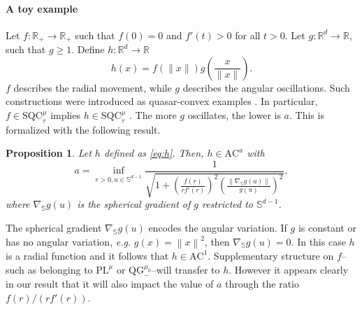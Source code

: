\documentclass{article}
\def\R{{\mathbb{R}}}
\def\sphere{\mathbb{S}}
\def\pl{{\text{PL}^\mu}}
\newcommand{\bpar}[1]{\left(#1\right)}
\newcommand{\norm}[1]{\left\lVert#1\right\rVert}
\newcommand{\sqc}{\text{SQC}_{\tau}^{\mu}}
\newcommand{\ac}{\text{AC}^{a}}
\newcommand{\acf}[1]{\text{AC}^{#1}}
\newcommand{\qginf}{\text{QG}_{-}^{\mu_0}}
\theoremstyle{plain}
\newtheorem{proposition}[theorem]{Proposition}
\theoremstyle{definition}
\theoremstyle{remark}
\begin{document}

\paragraph{A toy example}
 Let $f:\R_+ \to \R_+$ such that $f(0) = 0$ and $f'(t)> 0$ for all $t> 0$. Let $g : \R^d \to \R$, such that $g\ge 1$. Define $h :\R^d \to \R$
  \begin{equation}\label{eq:h}
    h(x) = f(\lVert x \rVert)g\left(\frac{x}{\lVert x \rVert} \right).
\end{equation}
$f$ describes the radial movement, while $g$ describes the angular oscillations. Such constructions were introduced as quasar-convex examples \cite{lee2016optimizingstarconvex}. In particular, $f \in \sqc$ implies $h \in \sqc$ \cite[Proposition 8]{hermant2024study}. 
 The more $g$ oscillates, the lower is $a$. This is formalized with the following result.
\begin{proposition}\label{lem:toy_example_ac}
Let $h$ defined as \eqref{eq:h}. Then, $h \in \ac$ with
    \[a= \inf_{r>0,u \in \mathbb{S}^{d-1}} \frac{1}{\sqrt{1+ \bpar{\frac{f(r)}{rf'(r)}}^2 \bpar{\frac{\norm{\nabla_{\sphere} g(u)}}{g(u)}}^2}},  \]
    where $\nabla_{\sphere} g(u)$ is the spherical gradient of $g$ restricted to $ \mathbb{S}^{d-1}$.
\end{proposition}
The spherical gradient $\nabla_{\sphere} g(u)$ encodes the angular variation. If $g$ is constant or has no angular variation, \textit{e.g.} $g(x) = \norm{x}^2$, then $\nabla_{\sphere} g(u)= 0$. In this case $h$ is a radial function and it follows that $h \in \acf{1}$. Supplementary structure on $f$--such as belonging to $\pl$ or $\qginf$--will transfer to $h$. However it appears clearly in our result that it will also impact the value of $a$ through the ratio $f(r)/(rf'(r))$.
\end{document}
